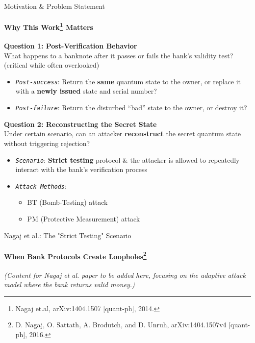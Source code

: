\documentclass{beamer}
\begin{document}
\begin{frame}{Motivation \& Problem Statement}
    \framesubtitle{Why This Work\footnote{Nagaj et.al, arXiv:1404.1507 [quant-ph], 2014.} Matters}

    \textbf{Question 1: Post-Verification Behavior}\\
    What happens to a banknote after it passes or fails the bank’s validity test? (critical while often overlooked)
    \begin{itemize}
        \item \emph{\tt{Post-success}}:  
            Return the \textbf{same} quantum state to the owner,  
            or replace it with a \textbf{newly issued} state and serial number?
        \item \emph{\tt{Post-failure}}:  
            Return the disturbed “bad” state to the owner,  
            or destroy it?
    \end{itemize}
    \pause

    \textbf{Question 2: Reconstructing the Secret State}\\
    Under certain scenario, can an attacker \textbf{reconstruct} the secret quantum state without triggering rejection?

    \begin{itemize}
        \item \emph{\tt{Scenario}}:  
            \textbf{Strict testing} protocol \& the attacker is allowed to repeatedly interact with the bank’s verification process
        \item \emph{\tt{Attack Methods}}:  
            \begin{itemize}
                \item BT (Bomb-Testing) attack  
                \item PM (Protective Measurement) attack
            \end{itemize}
    \end{itemize}
\end{frame}

\begin{frame}{Nagaj et al.: The "Strict Testing" Scenario}
    \framesubtitle{When Bank Protocols Create Loopholes\footnote{D. Nagaj, O. Sattath, A. Brodutch, and D. Unruh, arXiv:1404.1507v4 [quant-ph], 2016.}}
    \vspace{1cm}
    \centering
    \textit{(Content for Nagaj et al. paper to be added here, focusing on the adaptive attack model where the bank returns valid money.)}
\end{frame}
\end{document}

